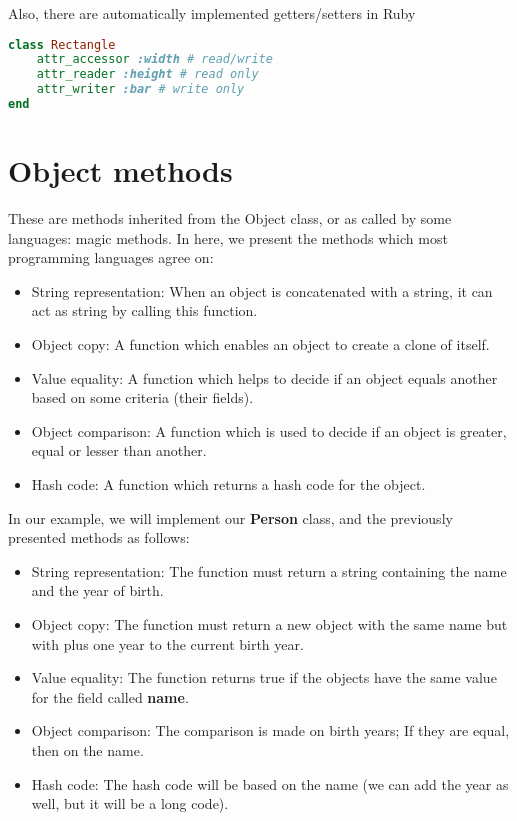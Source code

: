 \documentclass{KodeBook}
\begin{document}


Also, there are automatically implemented getters/setters in Ruby

\begin{lstlisting}[style=codeStyle, language=Ruby]
class Rectangle
	attr_accessor :width # read/write
	attr_reader :height # read only
	attr_writer :bar # write only
end 
\end{lstlisting} 

\section{Object methods}

These are methods inherited from the Object class, or as called by some languages: magic methods.
In here, we present the methods which most programming languages agree on:
\begin{itemize}
	\item String representation: When an object is concatenated with a string, it can act as string by calling this function.
	\item Object copy: A function which enables an object to create a clone of itself.
	\item Value equality: A function which helps to decide if an object equals another based on some criteria (their fields).
	\item Object comparison: A function which is used to decide if an object is greater, equal or lesser than another.
	\item Hash code: A function which returns a hash code for the object. 
\end{itemize}

In our example, we will implement our \textbf{Person} class, and the previously presented methods as follows:
\begin{itemize}
	\item String representation: The function must return a string containing the name and the year of birth.
	\item Object copy: The function must return a new object with the same name but with plus one year to the current birth year.
	\item Value equality: The function returns true if the objects have the same value for the field called \textbf{name}.
	\item Object comparison: The comparison is made on birth years; If they are equal, then on the name.
	\item Hash code: The hash code will be based on the name (we can add the year as well, but it will be a long code). 
\end{itemize}
\end{document}

